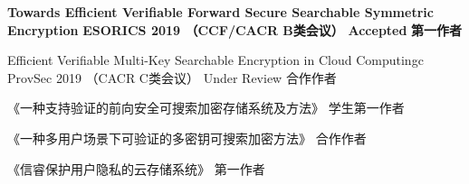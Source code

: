 \documentclass[zh]{resume}
\begin{document}
\begin{myresearchs}
  \myresearch
    {\textbf{Towards Efficient Verifiable Forward Secure Searchable Symmetric Encryption}}
    {\textbf{ESORICS 2019 （CCF/CACR B类会议）}}
    {\textbf{Accepted}}
    {\textbf{第一作者}}%

  \myresearch
    {Efficient Verifiable Multi-Key Searchable Encryption in Cloud Computingc}
    {ProvSec 2019 （CACR C类会议）}
    {Under Review}
    {合作作者}

  \myzhuanli
    {《一种支持验证的前向安全可搜索加密存储系统及方法》}
    {学生第一作者}

  \myzhuanli
    {《一种多用户场景下可验证的多密钥可搜索加密方法》}
    {合作作者}

  \myruanzhu
    {《信睿保护用户隐私的云存储系统》}
    {第一作者}

\end{myresearchs}
\end{document}
